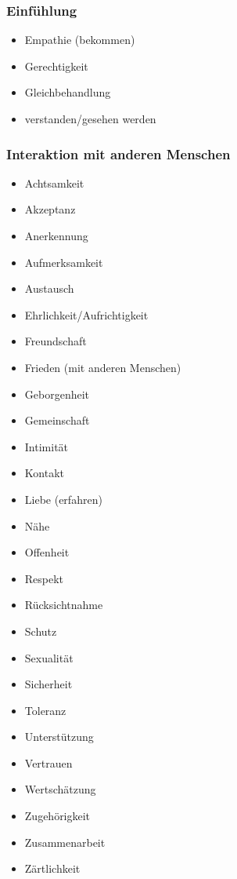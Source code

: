 \subsubsection{Einfühlung}

\begin{multicols}{2}
  \begin{itemize}
    \item Empathie (bekommen)
    \item Gerechtigkeit
    \item Gleichbehandlung
    \item verstanden/gesehen werden
  \end{itemize}
\end{multicols}


\subsubsection{Interaktion mit anderen Menschen}

\begin{multicols}{2}
  \begin{itemize}
    \item Achtsamkeit
    \item Akzeptanz
    \item Anerkennung
    \item Aufmerksamkeit
    \item Austausch
    \item Ehrlichkeit/Aufrichtigkeit
    \item Freundschaft
    \item Frieden (mit anderen Menschen)
    \item Geborgenheit
    \item Gemeinschaft
    \item Intimität
    \item Kontakt
    \item Liebe (erfahren)
    \item Nähe
    \item Offenheit
    \item Respekt
    \item Rücksichtnahme
    \item Schutz
    \item Sexualität
    \item Sicherheit
    \item Toleranz
    \item Unterstützung
    \item Vertrauen
    \item Wertschätzung
    \item Zugehörigkeit
    \item Zusammenarbeit
    \item Zärtlichkeit
  \end{itemize}
\end{multicols}


